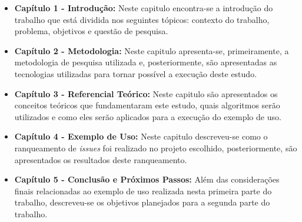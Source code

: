 \begin{itemize}
    \item \textbf{Capítulo 1 - Introdução:} Neste capitulo encontra-se a introdução do trabalho que está dividida nos seguintes tópicos: contexto do trabalho, problema, objetivos e questão de pesquisa.
    \item \textbf{Capítulo 2 - Metodologia:} Neste capitulo apresenta-se, primeiramente, a metodologia de pesquisa utilizada e, posteriormente, são apresentadas as tecnologias utilizadas para tornar possível a execução deste estudo.
    \item \textbf{Capítulo 3 - Referencial Teórico:} Neste capitulo são apresentados os conceitos teóricos que fundamentaram este estudo, quais algoritmos serão utilizados e como eles serão aplicados para a execução do exemplo de uso.
    \item \textbf{Capítulo 4 - Exemplo de Uso:} Neste capitulo descreveu-se como o ranqueamento de \textit{issues} foi realizado no projeto escolhido, posteriormente, são apresentados os resultados deste ranqueamento.
    \item \textbf{Capítulo 5 - Conclusão e Próximos Passos:} Além das considerações finais relacionadas ao exemplo de uso realizada nesta primeira parte do trabalho, descreveu-se os objetivos planejados para a segunda parte do trabalho.
\end{itemize}
